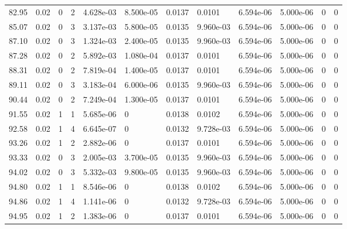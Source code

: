 \documentclass[preview]{standalone}
\begin{document}
{{{\begin{tabular}{L{1.2cm}C{1.2cm} C{0.3cm}C{0.5cm} C{1.4cm}C{1.4cm} C{1.4cm}C{1.4cm} C{1.6cm}C{1.6cm} C{1.6cm}C{1.6cm}}
  82.95  &  0.02  & 0     &  2 &  4.628e-03  & 8.500e-05  &  0.0137&   0.0101& 6.594e-06 & 5.000e-06   &  0 & 0  \\ 
  85.07  &  0.02  & 0     &  3 &  3.137e-03  & 5.800e-05  &  0.0135&   9.960e-03& 6.594e-06 & 5.000e-06   &  0 & 0  \\ 
  87.10  &  0.02  & 0     &  3 &  1.324e-03  & 2.400e-05  &  0.0135&   9.960e-03& 6.594e-06 & 5.000e-06   &  0 & 0  \\ 
  87.28  &  0.02  & 0     &  2 &  5.892e-03  & 1.080e-04  &  0.0137&   0.0101& 6.594e-06 & 5.000e-06   &  0 & 0  \\ 
  88.31  &  0.02  & 0     &  2 &  7.819e-04  & 1.400e-05  &  0.0137&   0.0101& 6.594e-06 & 5.000e-06   &  0 & 0  \\ 
  89.11  &  0.02  & 0     &  3 &  3.183e-04  & 6.000e-06  &  0.0135&   9.960e-03& 6.594e-06 & 5.000e-06   &  0 & 0  \\ 
  90.44  &  0.02  & 0     &  2 &  7.249e-04  & 1.300e-05  &  0.0137&   0.0101& 6.594e-06 & 5.000e-06   &  0 & 0  \\ 
  91.55  &  0.02  & 1     &  1 &  5.685e-06  & 0  &  0.0138&   0.0102& 6.594e-06 & 5.000e-06   &  0 & 0  \\ 
  92.58  &  0.02  & 1     &  4 &  6.645e-07  & 0  &  0.0132&   9.728e-03& 6.594e-06 & 5.000e-06   &  0 & 0  \\ 
  93.26  &  0.02  & 1     &  2 &  2.882e-06  & 0  &  0.0137&   0.0101& 6.594e-06 & 5.000e-06   &  0 & 0  \\ 
  93.33  &  0.02  & 0     &  3 &  2.005e-03  & 3.700e-05  &  0.0135&   9.960e-03& 6.594e-06 & 5.000e-06   &  0 & 0  \\ 
  94.02  &  0.02  & 0     &  3 &  5.332e-03  & 9.800e-05  &  0.0135&   9.960e-03& 6.594e-06 & 5.000e-06   &  0 & 0  \\ 
  94.80  &  0.02  & 1     &  1 &  8.546e-06  & 0  &  0.0138&   0.0102& 6.594e-06 & 5.000e-06   &  0 & 0  \\ 
  94.86  &  0.02  & 1     &  4 &  1.141e-06  & 0  &  0.0132&   9.728e-03& 6.594e-06 & 5.000e-06   &  0 & 0  \\ 
  94.95  &  0.02  & 1     &  2 &  1.383e-06  & 0  &  0.0137&   0.0101& 6.594e-06 & 5.000e-06   &  0 & 0  \\ 
\hline 
\end{tabular} 

}}}
\end{document}
